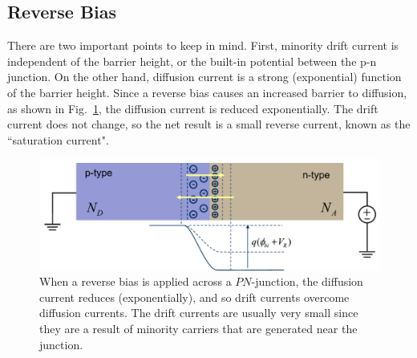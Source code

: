 \subsection{Reverse Bias}
There are two important points to keep in mind.  First, minority drift current is independent of the barrier height, or the built-in potential between the p-n junction.  On the other hand, diffusion current is a strong (exponential) function of the barrier height.  Since a reverse bias causes an increased barrier to diffusion, as shown in Fig.~\ref{fig:slide36}, the diffusion current is reduced exponentially.  The drift current does not change, so the net result is a small reverse current, known as the ``saturation current".  
\begin{figure}[tb]
\centering
\includegraphics[width=.75\columnwidth]{slide36}
\caption{When a reverse bias is applied across a $PN$-junction, the diffusion current reduces (exponentially), and so drift currents overcome diffusion currents.  The drift currents are usually very small since they are a result of minority carriers that are generated near the junction.}
\label{fig:slide36}
\end{figure}
